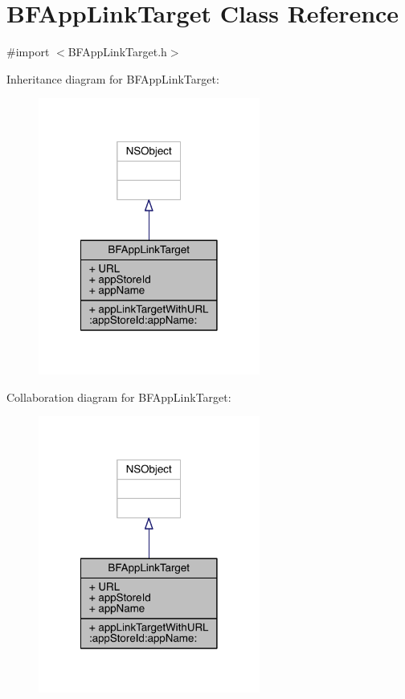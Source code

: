 \hypertarget{interface_b_f_app_link_target}{\section{B\-F\-App\-Link\-Target Class Reference}
\label{interface_b_f_app_link_target}
}


{\ttfamily \#import $<$B\-F\-App\-Link\-Target.\-h$>$}



Inheritance diagram for B\-F\-App\-Link\-Target\-:
\nopagebreak
\begin{figure}[H]
\begin{center}
\leavevmode
\includegraphics[width=206pt]{interface_b_f_app_link_target__inherit__graph}
\end{center}
\end{figure}


Collaboration diagram for B\-F\-App\-Link\-Target\-:
\nopagebreak
\begin{figure}[H]
\begin{center}
\leavevmode
\includegraphics[width=206pt]{interface_b_f_app_link_target__coll__graph}
\end{center}
\end{figure}
